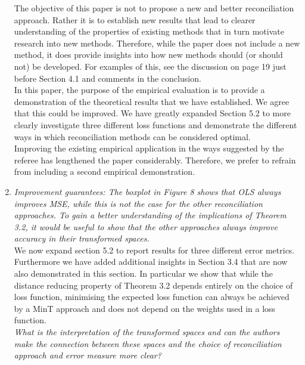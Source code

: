 \documentclass[a4paper,11pt]{article}
\begin{document}
\begin{enumerate}
		The objective of this paper is not to propose a new and better reconciliation approach.  Rather it is to establish new results that lead to clearer understanding of the properties of existing methods that in turn motivate research into new methods.  Therefore, while the paper does not include a new method, it does provide insights into how new methods should (or should not) be developed.  For examples of this, see the discussion on page 19 just before Section 4.1 and comments in the conclusion.\\
		
		In this paper, the purpose of the empirical evaluation is to provide a demonstration of the theoretical results that we have established.  We agree that this could be improved.  We have greatly expanded Section 5.2 to more clearly investigate three different loss functions and demonstrate the different ways in which reconciliation methods can be considered optimal.\\
		
		Improving the existing empirical application in the ways suggested by the referee has lengthened the paper considerably.  Therefore, we prefer to refrain from including a second empirical demonstration.\\
		
		\item \textit{Improvement guarantees: The boxplot in Figure 8 shows that OLS always improves MSE, while this is not the case for the other reconciliation approaches. To gain a better understanding of the implications of Theorem 3.2, it would be useful to show that the other approaches always
		improve accuracy in their transformed spaces.}\\
	
	    We now expand section 5.2 to report results for three different error metrics.  Furthermore we have added additional insights in Section 3.4 that are now also demonstrated in this section.  In particular we show that while the distance reducing property of Theorem 3.2 depends entirely on the choice of loss function, minimising the expected loss function can always be achieved by a MinT approach and does not depend on the weights used in a loss function.\\ 
		
		\textit{What is the interpretation of the transformed spaces and can the authors make the connection	between these spaces and the choice of reconciliation approach and error measure more clear?}\\ 
	

\end{enumerate}
\end{document}
